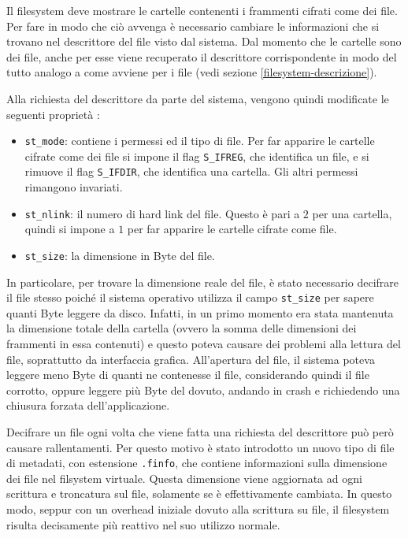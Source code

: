 \documentclass[a4paper,12pt,twoside,openright]{report}
\begin{document}
  Il filesystem deve mostrare le cartelle contenenti i frammenti cifrati come dei file.
  Per fare in modo che ciò avvenga è necessario cambiare le informazioni che si trovano nel
  descrittore del file visto dal sistema.
  Dal momento che le cartelle sono dei file, anche per esse viene recuperato il descrittore corrispondente
  in modo del tutto analogo a come avviene per i file (vedi sezione \ref{filesystem-descrizione}).
  
  Alla richiesta del descrittore da parte del sistema, vengono quindi modificate le seguenti proprietà \cite{linuxmanstat}:
  \begin{itemize}
    \item \texttt{st\_mode}: contiene i permessi ed il tipo di file. Per far apparire le cartelle cifrate come
          dei file si impone il flag \texttt{S\_IFREG}, che identifica un file, e si rimuove il flag
          \texttt{S\_IFDIR}, che identifica una cartella. Gli altri permessi rimangono invariati.
    \item \texttt{st\_nlink}: il numero di hard link del file. Questo è pari a $2$ per una cartella, quindi si
          impone a $1$ per far apparire le cartelle cifrate come file.
    \item \texttt{st\_size}: la dimensione in Byte del file.
  \end{itemize}

  In particolare, per trovare la dimensione reale del file, è stato necessario decifrare il file stesso
  poiché il sistema operativo utilizza il campo \texttt{st\_size} per sapere quanti Byte leggere da disco\footnotemark.
  Infatti, in un primo momento era stata mantenuta la dimensione totale della cartella (ovvero la somma delle dimensioni
  dei frammenti in essa contenuti) e questo poteva causare dei problemi alla lettura del file, soprattutto da interfaccia grafica.
  All'apertura del file, il sistema poteva leggere meno Byte di quanti ne contenesse il file, considerando quindi il file corrotto, oppure
  leggere più Byte del dovuto, andando in crash e richiedendo una chiusura forzata dell'applicazione.

  Decifrare un file ogni volta che viene fatta una richiesta del descrittore può però causare rallentamenti.
  Per questo motivo è stato introdotto un nuovo tipo di file di metadati, con estensione \texttt{.finfo}, che contiene 
  informazioni sulla dimensione dei file nel filsystem virtuale. Questa dimensione viene aggiornata
  ad ogni scrittura e troncatura sul file, solamente se è effettivamente cambiata.
  In questo modo, seppur con un overhead iniziale dovuto alla scrittura su file, il filesystem risulta
  decisamente più reattivo nel suo utilizzo normale.
\end{document}

